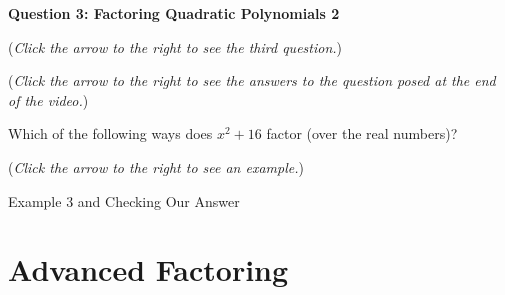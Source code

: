 \documentclass{ximera}
\begin{document}
\textbf{Question 3: Factoring Quadratic Polynomials 2}
\begin{question}
\begin{flushright}
{\color{blue}(\emph{Click the arrow to the right to see the third question.})}
\end{flushright}
\begin{center}
\begin{expandable}
{\color{blue}(\emph{Click the arrow to the right to see the answers 
to the question posed at the end of the video.})}
\begin{expandable}
Which of the following ways does $x^2+16$ factor (over the real numbers)?
\begin{multipleChoice}
\end{multipleChoice}
\begin{flushright}
{\color{blue}(\emph{Click the arrow to the right to see an example.})}
\end{flushright}
\begin{expandable}
Example 3 and Checking Our Answer
\end{expandable}
\end{expandable}
\end{expandable}
\end{center}
\end{question}


\section{Advanced Factoring}
\end{document}
